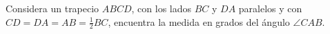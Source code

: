 Considera un trapecio $ABCD$, con los lados $BC$ y $DA$ paralelos y con $CD = DA = AB = \frac12 BC$, encuentra la medida en grados del ángulo $\angle CAB$.